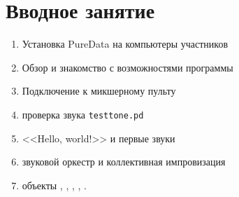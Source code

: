 \section{Вводное занятие}

\begin{enumerate}
	\item Установка PureData на компьютеры участников
	\item Обзор и знакомство с возможностями программы
	\item Подключение к микшерному пульту
	\item проверка звука \texttt{testtone.pd}
	\item <<Hello, world!>> и первые звуки
	\item звуковой оркестр и коллективная импровизация 
	\item объекты , , \pdobj{*\~}, , .
\end{enumerate}

